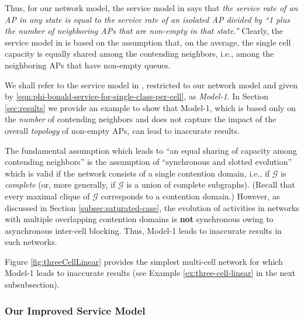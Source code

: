 \documentclass[10pt,a4paper,journal]{IEEEtran}
\theoremstyle{definition}
\theoremstyle{remark}
\theoremstyle{plain}
\begin{document}
Thus, for our network model, the service model in \cite{wanet.bonald08multicellprocsharing} says that \textit{the service rate of an AP in any state is equal to the service rate of an isolated AP divided by ``1 plus the number of neighboring APs that are non-empty in that state.''} Clearly, the service model in \cite{wanet.bonald08multicellprocsharing} is based on the assumption that, on the average, the single cell capacity is equally shared among the contending neighbors, i.e., among the neighboring APs that have non-empty queues. 

We shall refer to the service model in \cite{wanet.bonald08multicellprocsharing}, restricted to our network model and given by \eqref{eqn:phi-bonald-service-for-single-class-per-cell}, as \textit{Model-1}. In Section \ref{sec:results} we provide an example to show that Model-1, which is based only on the \textit{number} of contending neighbors and does not capture the impact of the overall \textit{topology} of non-empty APs, can lead to inaccurate results.

The fundamental assumption which leads to ``an equal sharing of capacity among contending neighbors'' is the assumption of ``synchronous and slotted evolution'' \cite{wanet.bonald08multicellprocsharing} which is valid if the network consists of a single contention domain, i.e., if $\mathcal{G}$ is \textit{complete} (or, more generally, if $\mathcal{G}$ is a union of complete subgraphs). (Recall that every maximal clique of $\mathcal{G}$ corresponds to a contention domain.) However, as discussed in Section \ref{subsec:saturated-case}, the evolution of activities in networks with multiple overlapping contention domains is \textbf{not} synchronous owing to asynchronous inter-cell blocking. Thus, Model-1 leads to inaccurate results in such networks. 

Figure \ref{fig:threeCellLinear} provides the simplest multi-cell network for which Model-1 leads to inaccurate results (see Example \ref{ex:three-cell-linear} in the next subsubsection). 




\subsubsection{Our Improved Service Model}
\label{subsubsec:our-improved-service-model}
\end{document}
